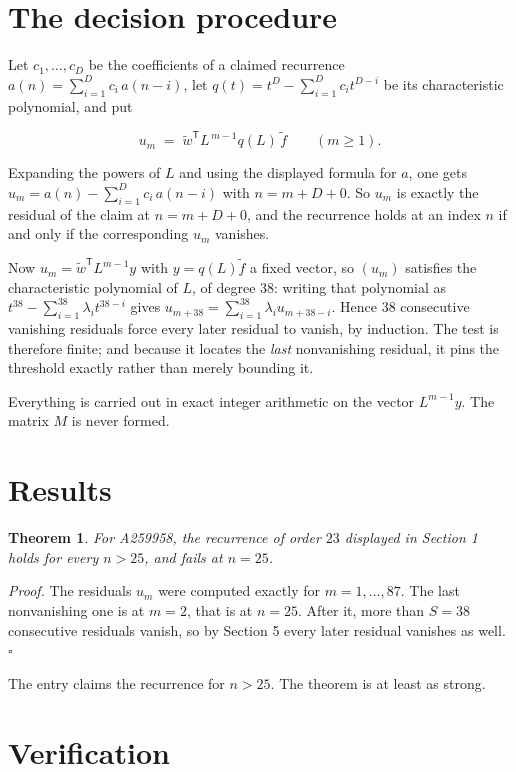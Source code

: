 \documentclass[11pt]{article}
\newtheorem{theorem}{Theorem}
\theoremstyle{definition}
\begin{document}
\section{The decision procedure}

Let $c_1,\dots,c_D$ be the coefficients of a claimed recurrence $a(n) = \sum_{i=1}^{D} c_i\,a(n-i)$, let $q(t) = t^{D} - \sum_{i=1}^{D} c_i t^{D-i}$ be its characteristic polynomial, and put

\[u_m \;=\; \tilde w^{\mathsf T} L^{\,m-1} q(L)\,\tilde f \qquad (m \ge 1).\]

Expanding the powers of $L$ and using the displayed formula for $a$, one gets $u_m = a(n) - \sum_{i=1}^{D} c_i\,a(n-i)$ with $n = m + D + 0$. So $u_m$ is exactly the residual of the claim at $n = m + D + 0$, and the recurrence holds at an index $n$ if and only if the corresponding $u_m$ vanishes.

Now $u_m = \tilde w^{\mathsf T} L^{m-1} y$ with $y = q(L)\tilde f$ a fixed vector, so $(u_m)$ satisfies the characteristic polynomial of $L$, of degree $38$: writing that polynomial as $t^{38} - \sum_{i=1}^{38} \lambda_i t^{38-i}$ gives $u_{m+38} = \sum_{i=1}^{38} \lambda_i u_{m+38-i}$. Hence $38$ consecutive vanishing residuals force every later residual to vanish, by induction. The test is therefore finite; and because it locates the {\itshape last} nonvanishing residual, it pins the threshold exactly rather than merely bounding it.

Everything is carried out in exact integer arithmetic on the vector $L^{m-1}y$. The matrix $M$ is never formed.

\section{Results}

\begin{theorem} For A259958, the recurrence of order $23$ displayed in Section 1 holds for every $n > 25$, and fails at $n = 25$.\end{theorem}

{\itshape Proof.} The residuals $u_m$ were computed exactly for $m = 1,\dots,87$. The last nonvanishing one is at $m = 2$, that is at $n = 25$. After it, more than $S = 38$ consecutive residuals vanish, so by Section 5 every later residual vanishes as well. $\square$

The entry claims the recurrence for $n > 25$. The theorem is at least as strong.

\section{Verification}
\end{document}
